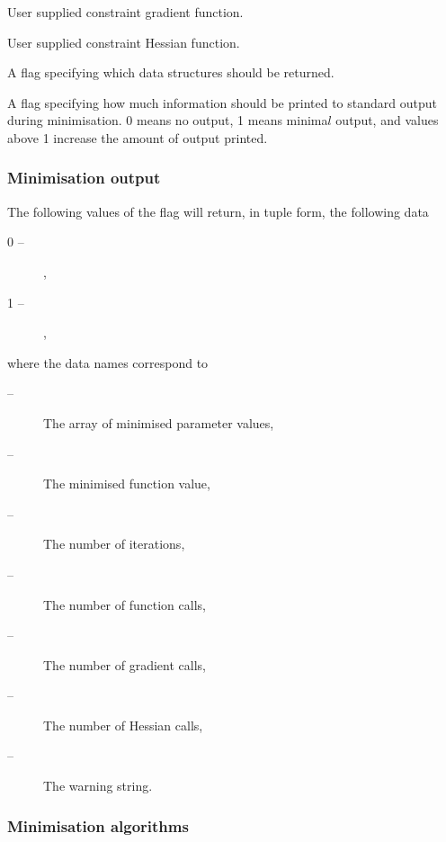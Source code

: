   User supplied constraint gradient function. 

  User supplied constraint Hessian function. 

  A flag specifying which data structures should be returned. 

  A flag specifying how much information should be printed to standard output during minimisation.  0 means no output, 1 means minima$l$ output, and values above 1 increase the amount of output printed. 




\subsubsection{Minimisation output}

The following values of the  flag will return, in tuple form, the following data


\begin{description}
\item[0 --]  , 
\item[1 --]  , 
\end{description}


where the data names correspond to


\begin{description}
\item[ --]      The array of minimised parameter values, 
\item[ --]      The minimised function value, 
\item[ --]       The number of iterations, 
\item[ --] The number of function calls, 
\item[ --] The number of gradient calls, 
\item[ --] The number of Hessian calls, 
\item[ --] The warning string. 
\end{description}



\subsubsection{Minimisation algorithms}

